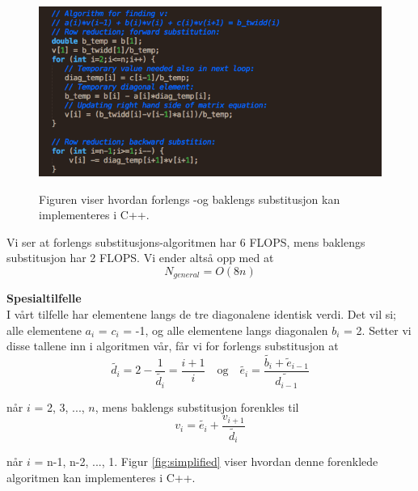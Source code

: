 \documentclass{article}
\begin{document}
\FloatBarrier
\begin{figure}[!ht]
  \begin{center}
  \includegraphics[width = 130mm]{gauss_algoritme.png}\\
  \caption{Figuren viser hvordan forlengs -og baklengs substitusjon kan implementeres i C++. }\label{fig:gausskode}
  \end{center}
\end{figure}
\FloatBarrier

Vi ser at forlengs substitusjons-algoritmen har 6 FLOPS, mens baklengs substitusjon har 2 FLOPS. Vi ender altså opp med at 
\begin{equation}
N_{general} = O(8n)
\end{equation}

\textbf{Spesialtilfelle}\\
I vårt tilfelle har elementene langs de tre diagonalene identisk verdi. Det vil si; alle elementene $a_i$ = $c_i$ = -1, og alle elementene langs diagonalen $b_i$ = 2. Setter vi disse tallene inn i algoritmen vår, får vi for forlengs substitusjon at
\begin{equation}
\tilde{d_i} = 2 - \frac{1}{\tilde{d_i}} = \frac{i+1}{i} \quad \textrm{og} \quad \tilde{e_i} = \frac{\tilde{b_i} + \tilde{e}_{i-1}}{\tilde{d_{i-1}}}
\end{equation}

når $i$ = 2, 3, ..., $n$, mens baklengs substitusjon forenkles til
\begin{equation}
v_i = \tilde{e_i} + \frac{v_{i+1}}{\tilde{d_i}}
\end{equation}

når $i$ = n-1, n-2, ..., 1. Figur \ref{fig:simplified} viser hvordan denne forenklede algoritmen kan implementeres i C++.
\end{document}
